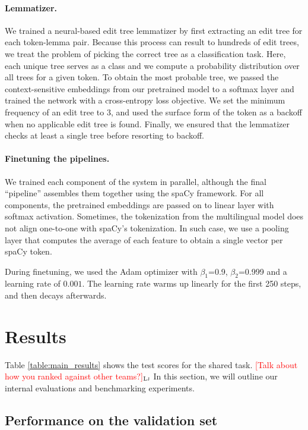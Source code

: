 \documentclass[11pt]{article}
\newcommand{\draftonly}[1]{#1}
\newcommand{\draftcomment}[3]{\draftonly{\textcolor{#2}{[#3]{$_{\textsc{#1}}$}}}}
\newcommand{\lj}[1]{\draftcomment{Lj}{red}{#1}}
\begin{document}
\paragraph{Lemmatizer.} 
We trained a neural-based edit tree lemmatizer \cite{muller-etal-2015-joint} by first extracting an edit tree for each token-lemma pair.
Because this process can result to hundreds of edit trees, we treat the problem of picking the correct tree as a classification task.
Here, each unique tree serves as a class and we compute a probability distribution over all trees for a given token.
To obtain the most probable tree, we passed the context-sensitive embeddings from our pretrained model to a softmax layer and trained the network with a cross-entropy loss objective.
We set the minimum frequency of an edit tree to 3, and used the surface form of the token as a backoff when no applicable edit tree is found.
Finally, we ensured that the lemmatizer checks at least a single tree before resorting to backoff. 

\paragraph{Finetuning the pipelines.} We trained each component of the system in parallel, although the final ``pipeline'' assembles them together using the spaCy framework.
For all components, the pretrained embeddings are passed on to linear layer with softmax activation.
Sometimes, the tokenization from the multilingual model does not align one-to-one with spaCy's tokenization.
In such case, we use a pooling layer that computes the average of each feature to obtain a single vector per spaCy token.

During finetuning, we used the Adam optimizer with $\beta_1$=0.9, $\beta_2$=0.999 and a learning rate of $0.001$.
The learning rate warms up linearly for the first 250 steps, and then decays afterwards.

\section{Results}

Table \ref{table:main_results} shows the test scores for the shared task.
\lj{Talk about how you ranked against other teams?}
In this section, we will outline our internal evaluations and benchmarking experiments.

\subsection{Performance on the validation set}
\end{document}
